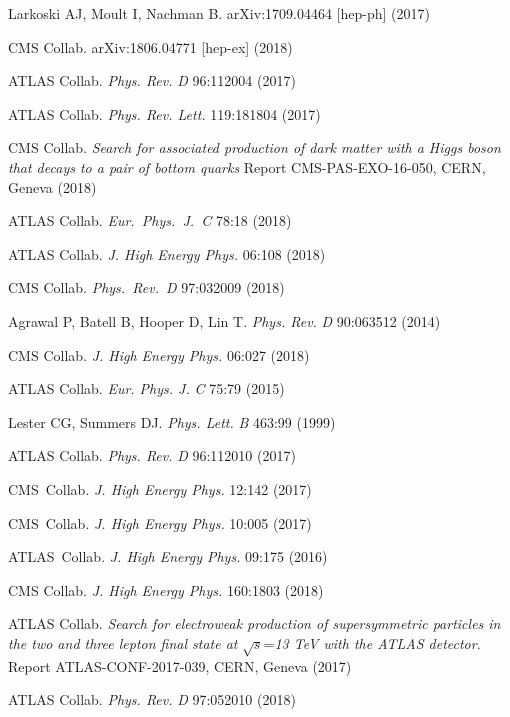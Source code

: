 \documentclass{ar-1col}
\begin{document}
{\begin{thebibliography}{175}
Larkoski AJ, Moult I, Nachman B. arXiv:1709.04464 [hep-ph] (2017)

CMS Collab. arXiv:1806.04771 [hep-ex] (2018)

{ATLAS Collab.} \textit{Phys. Rev.} \textit{D} 96:112004 (2017)

{ATLAS Collab.} \textit{Phys. Rev. Lett.} 119:181804 (2017)

CMS Collab.
\textit{Search for associated production of dark matter with a Higgs boson that decays to a pair of bottom quarks}
Report CMS-PAS-EXO-16-050, CERN, Geneva (2018)

{ATLAS Collab.}  \textit{Eur.\ Phys.\ J.\ C} {78}:18 (2018)

{ATLAS Collab.} \textit{J. High Energy Phys.} 06:108 (2018)

{CMS Collab.} \textit{Phys.\ Rev.\ D} {97}:032009 (2018)

Agrawal P, Batell B, Hooper D, Lin T. \textit{Phys. Rev.}
\textit{D} 90:063512 (2014)

{CMS Collab.} \textit{J. High Energy Phys.} 06:027 (2018)

{ATLAS Collab}. \textit{Eur. Phys. J.} \textit{C} 75:79 (2015)

Lester CG, Summers DJ. \textit{Phys. Lett.} \textit{B} 463:99 (1999)

{ATLAS Collab.} \textit{Phys. Rev.} \textit{D} 96:112010 (2017)

{CMS~Collab.} \textit{J. High Energy Phys.} 12:142 (2017)

{CMS~Collab.} \textit{J. High Energy Phys.} 10:005 (2017)

{ATLAS~Collab.} \textit{J. High Energy Phys.} 09:175 (2016)

{CMS Collab.} \textit{J. High Energy Phys.} 160:1803 (2018)

ATLAS Collab. \textit{Search for electroweak production of supersymmetric particles in the two and three lepton final state at} $\sqrt{s}$=\textit{13 TeV with the ATLAS detector}.
Report ATLAS-CONF-2017-039, CERN, Geneva (2017)

{ATLAS Collab}. \textit{Phys. Rev.} \textit{D} 97:052010 (2018)


\end{thebibliography}}
\end{document}
